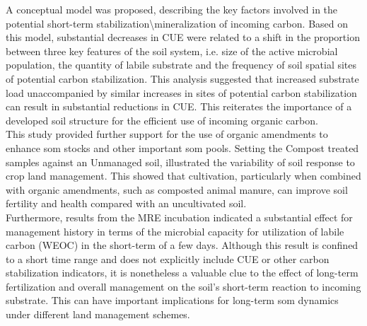 A conceptual model was proposed, describing the key factors involved in the potential short-term stabilization\textbackslash mineralization of incoming carbon. Based on this model, substantial decreases in CUE were related to a shift in the proportion between three key features of the soil system, i.e. size of the active microbial population, the quantity of labile substrate and the frequency of soil spatial sites of potential carbon stabilization. This analysis suggested that increased substrate load unaccompanied by similar increases in sites of potential carbon stabilization can result in substantial reductions in CUE. This reiterates the importance of a developed soil structure for the efficient use of incoming organic carbon.\\
This study provided further support for the use of organic amendments to enhance \gls{som} stocks and other important \gls{som} pools. Setting the Compost treated samples against an Unmanaged soil, illustrated the variability of soil response to crop land management. This showed that cultivation, particularly when combined with organic amendments, such as composted animal manure, can improve soil fertility and health compared with an uncultivated soil.\\
Furthermore, results from the MRE incubation indicated a substantial effect for management history in terms of the microbial capacity for utilization of labile carbon (WEOC) in the short-term of a few days. Although this result is confined to a short time range and does not explicitly include CUE or other carbon stabilization indicators, it is nonetheless a valuable clue to the effect of long-term fertilization and overall management on the soil's short-term reaction to incoming substrate. This can have important implications for long-term \gls{som} dynamics under different land management schemes.  
      


 

